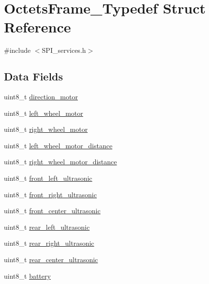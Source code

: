 \hypertarget{struct_octets_frame___typedef}{}\section{Octets\+Frame\+\_\+\+Typedef Struct Reference}
\label{struct_octets_frame___typedef}


{\ttfamily \#include $<$S\+P\+I\+\_\+services.\+h$>$}

\subsection*{Data Fields}
\begin{DoxyCompactItemize}
\item 
uint8\+\_\+t \hyperlink{struct_octets_frame___typedef_ab22e09e343196c1788780558d9e5a0ae}{direction\+\_\+motor}
\item 
uint8\+\_\+t \hyperlink{struct_octets_frame___typedef_a4c672398a89e5cf0164324a00183f922}{left\+\_\+wheel\+\_\+motor}
\item 
uint8\+\_\+t \hyperlink{struct_octets_frame___typedef_a27591501debf6e6053f7c3e376e5aa49}{right\+\_\+wheel\+\_\+motor}
\item 
uint8\+\_\+t \hyperlink{struct_octets_frame___typedef_ae15b87c890164bce27eb5f2607e64a25}{left\+\_\+wheel\+\_\+motor\+\_\+distance}
\item 
uint8\+\_\+t \hyperlink{struct_octets_frame___typedef_ac68f226c7529335c37f27cd95aedff32}{right\+\_\+wheel\+\_\+motor\+\_\+distance}
\item 
uint8\+\_\+t \hyperlink{struct_octets_frame___typedef_a0544c5e77443611e9c54c911f20e7504}{front\+\_\+left\+\_\+ultrasonic}
\item 
uint8\+\_\+t \hyperlink{struct_octets_frame___typedef_a58a01cc5d9578f22926385389b670bf8}{front\+\_\+right\+\_\+ultrasonic}
\item 
uint8\+\_\+t \hyperlink{struct_octets_frame___typedef_a6131a734576ec72a5975546ac9e6c004}{front\+\_\+center\+\_\+ultrasonic}
\item 
uint8\+\_\+t \hyperlink{struct_octets_frame___typedef_a8007022ee9ef4013b0cd17c8fea23d35}{rear\+\_\+left\+\_\+ultrasonic}
\item 
uint8\+\_\+t \hyperlink{struct_octets_frame___typedef_a28e44c9de4ac244a8450095ae356e345}{rear\+\_\+right\+\_\+ultrasonic}
\item 
uint8\+\_\+t \hyperlink{struct_octets_frame___typedef_aa211e19d6c5a23b9eca397d4818e93fc}{rear\+\_\+center\+\_\+ultrasonic}
\item 
uint8\+\_\+t \hyperlink{struct_octets_frame___typedef_a89e04157c4e1f65c9ab63bffa365c8a6}{battery}
\end{DoxyCompactItemize}


